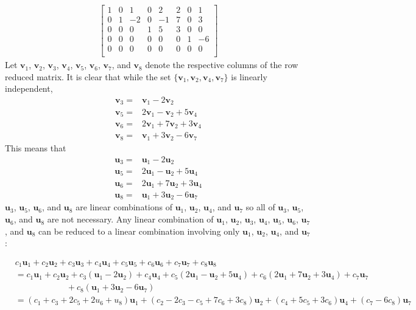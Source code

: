 \documentclass{article}
\begin{document}
\begin{itemize}
\begin{align*}
\begin{bmatrix}
1 & 0 &  1 & 0 &  2 &  2 & 0 &  1 \\
0 & 1 & -2 & 0 & -1 & 7 & 0 &  3 \\
0 & 0 &  0 & 1 &  5 &  3 & 0 &  0 \\
0 & 0 &  0 & 0 &  0 &  0 & 1 & -6 \\ 
0 & 0 &  0 & 0 &  0 &  0 & 0 &  0 \\
\end{bmatrix}
\end{align*}
Let \(\mathbf{v}_1\), \(\mathbf{v}_2\), \(\mathbf{v}_3\), \(\mathbf{v}_4\), \(\mathbf{v}_5\), \(\mathbf{v}_6\), \(\mathbf{v}_7\), and \(\mathbf{v}_8\) denote the respective columns of the row reduced matrix. It is clear that while the set \(\{\mathbf{v}_1, \mathbf{v}_2, \mathbf{v}_4, \mathbf{v}_7\}\) is linearly independent, 
\begin{align*}
\mathbf{v}_3 = & \mathbf{v}_1 - 2\mathbf{v}_2 \\ 
\mathbf{v}_5 = & 2\mathbf{v}_1 - \mathbf{v}_2 + 5\mathbf{v}_4 \\ 
\mathbf{v}_6 = & 2\mathbf{v}_1 + 7\mathbf{v}_2 + 3\mathbf{v}_4 \\
\mathbf{v}_8 = & \mathbf{v}_1 + 3\mathbf{v}_2 - 6\mathbf{v}_7 
\end{align*}
This means that 
\begin{align*}
\mathbf{u}_3 = & \mathbf{u}_1 - 2\mathbf{u}_2 \\ 
\mathbf{u}_5 = & 2\mathbf{u}_1 - \mathbf{u}_2 + 5\mathbf{u}_4 \\ 
\mathbf{u}_6 = & 2\mathbf{u}_1 + 7\mathbf{u}_2 + 3\mathbf{u}_4 \\
\mathbf{u}_8 = & \mathbf{u}_1 + 3\mathbf{u}_2 - 6\mathbf{u}_7 
\end{align*}
\(\mathbf{u}_3\), \(\mathbf{u}_5\), \(\mathbf{u}_6\), and \(\mathbf{u}_8\) are linear combinations of \(\mathbf{u}_1\), \(\mathbf{u}_2\), \(\mathbf{u}_4\), and \(\mathbf{u}_7\) so all of  \(\mathbf{u}_3\), \(\mathbf{u}_5\), \(\mathbf{u}_6\), and \(\mathbf{u}_8\) are not necessary. Any linear combination of \(\mathbf{u}_1\), \(\mathbf{u}_2\), \(\mathbf{u}_3\), \(\mathbf{u}_4\), \(\mathbf{u}_5\), \(\mathbf{u}_6\), \(\mathbf{u}_7\), and \(\mathbf{u}_8\) can be reduced to a linear combination involving only \(\mathbf{u}_1\), \(\mathbf{u}_2\), \(\mathbf{u}_4\), and \(\mathbf{u}_7\):

\begin{align*}   
& c_1 \mathbf{u}_1 + c_2 \mathbf{u}_2 + c_3 \mathbf{u}_3 + c_4 \mathbf{u}_4 + c_5 \mathbf{u}_5 + c_6 \mathbf{u}_6 + c_7 \mathbf{u}_7 + c_8 \mathbf{u}_8 \\
& = c_1 \mathbf{u}_1 + c_2 \mathbf{u}_2 + c_3(\mathbf{u}_1 - 2\mathbf{u}_2) + c_4\mathbf{u}_4 + c_5 (2\mathbf{u}_1 - \mathbf{u}_2 + 5\mathbf{u}_4) + c_6 (2\mathbf{u}_1 + 7\mathbf{u}_2 + 3\mathbf{u}_4) + c_7 \mathbf{u}_7 \\ & \quad\quad\quad\quad\quad\quad + c_8 (\mathbf{u}_1 + 3\mathbf{u}_2 - 6\mathbf{u}_7) \\
& = (c_1 + c_3 + 2c_5 + 2u_6 + u_8)\mathbf{u}_1 + (c_2 - 2c_3 - c_5 + 7c_6 + 3c_8)\mathbf{u}_2 + (c_4 + 5c_5 + 3c_6)\mathbf{u}_4 + (c_7 - 6c_8)\mathbf{u}_7
\end{align*}   


\end{itemize}
\end{document}
